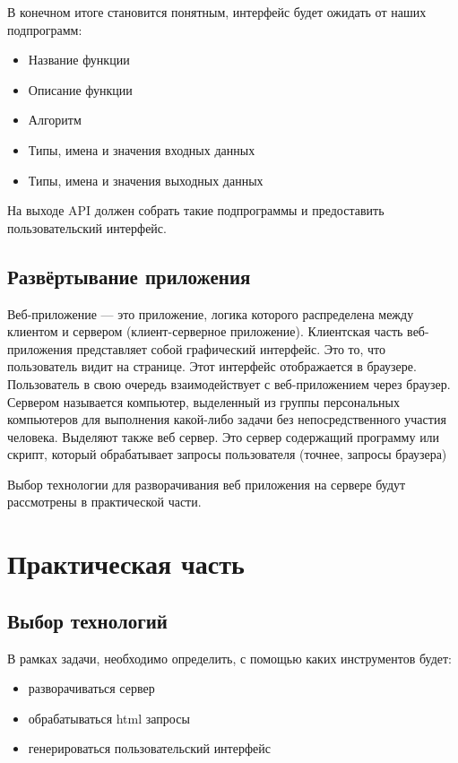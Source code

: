\documentclass[14pt,a4paper]{scrartcl}
\begin{document}
    В конечном итоге становится понятным, интерфейс будет ожидать от наших подпрограмм:
    \begin{itemize}
        \item Название функции
        \item Описание функции
        \item Алгоритм
        \item Типы, имена и значения входных данных
        \item Типы, имена и значения выходных данных
    \end{itemize}
    На выходе API должен собрать такие подпрограммы и предоставить пользовательский интерфейс.

    \subsection[Развёртывание приложения]{Развёртывание приложения}
    Веб-приложение — это приложение, логика которого распределена между клиентом и сервером (клиент-серверное приложение)\cite{Web-app-wiki}.
    Клиентская часть веб-приложения представляет собой графический интерфейс.
    Это то, что пользователь видит на странице.
    Этот интерфейс отображается в браузере.
    Пользователь в свою очередь взаимодействует с веб-приложением через браузер.
    Сервером называется компьютер, выделенный из группы персональных компьютеров для выполнения какой-либо задачи без непосредственного участия человека.\cite{Server}
    Выделяют также веб сервер. Это сервер содержащий программу или скрипт, который обрабатывает запросы пользователя (точнее, запросы браузера)\cite{Web-app-struct}

    Выбор технологии для разворачивания веб приложения на сервере будут рассмотрены в практической части.

    \newpage
    \section[Практическая часть]{Практическая часть}
    \subsection[Выбор технологий]{Выбор технологий}
    В рамках задачи, необходимо определить, с помощью каких инструментов будет:
    \begin{itemize}
        \item разворачиваться сервер
        \item обрабатываться html запросы
        \item генерироваться пользовательский интерфейс
    \end{itemize}
\end{document}
